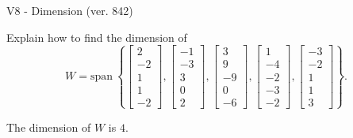 \begin{exercise}
  \begin{exerciseTitle}V8 - Dimension (ver. 842)\end{exerciseTitle}
  \begin{exerciseStatement}
    Explain how to find the dimension of 
\[W=\mathrm{span}\ \left\{\left[\begin{array}{r}
2 \\
-2 \\
1 \\
1 \\
-2
\end{array}\right] , \left[\begin{array}{r}
-1 \\
-3 \\
3 \\
0 \\
2
\end{array}\right] , \left[\begin{array}{r}
3 \\
9 \\
-9 \\
0 \\
-6
\end{array}\right] , \left[\begin{array}{r}
1 \\
-4 \\
-2 \\
-3 \\
-2
\end{array}\right] , \left[\begin{array}{r}
-3 \\
-2 \\
1 \\
1 \\
3
\end{array}\right]\right\}.\]



  \end{exerciseStatement}
  \begin{exerciseAnswer}
   The dimension of \(W\) is  \(4\).
  


  \end{exerciseAnswer}
\end{exercise}